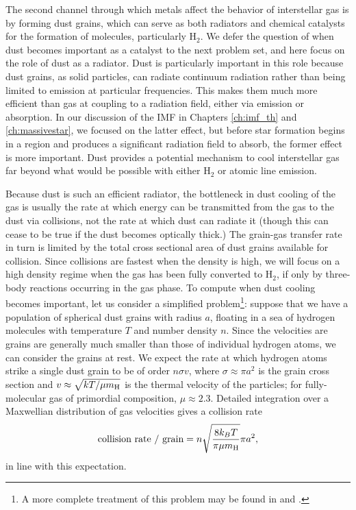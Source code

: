 The second channel through which metals affect the behavior of interstellar gas is by forming dust grains, which can serve as both radiators and chemical catalysts for the formation of molecules, particularly H$_2$. We defer the question of when dust becomes important as a catalyst to the next problem set, and here focus on the role of dust as a radiator. Dust is particularly important in this role because dust grains, as solid particles, can radiate continuum radiation rather than being limited to emission at particular frequencies. This makes them much more efficient than gas at coupling to a radiation field, either via emission or absorption. In our discussion of the IMF in Chapters \ref{ch:imf_th} and \ref{ch:massivestar}, we focused on the latter effect, but before star formation begins in a region and produces a significant radiation field to absorb, the former effect is more important. Dust provides a potential mechanism to cool interstellar gas far beyond what would be possible with either H$_2$ or atomic line emission.

Because dust is such an efficient radiator, the bottleneck in dust cooling of the gas is usually the rate at which energy can be transmitted from the gas to the dust via collisions, not the rate at which dust can radiate it (though this can cease to be true if the dust becomes optically thick.) The grain-gas transfer rate in turn is limited by the total cross sectional area of dust grains available for collision. Since collisions are fastest when the density is high, we will focus on a high density regime when the gas has been fully converted to H$_2$, if only by three-body reactions occurring in the gas phase. To compute when dust cooling becomes important, let us consider a simplified problem\footnote{A more complete treatment of this problem may be found in \citet{schneider06a} and \citet{schneider12a}.}: suppose that we have a population of spherical dust grains with radius $a$, floating in a sea of hydrogen molecules with temperature $T$ and number density $n$. Since the velocities are grains are generally much smaller than those of individual hydrogen atoms, we can consider the grains at rest. We expect the rate at which hydrogen atoms strike a single dust grain to be of order $n\sigma v$, where $\sigma \approx \pi a^2$ is the grain cross section and $v\approx \sqrt{kT/\mu m_{\rm H}}$ is the thermal velocity of the particles; for fully-molecular gas of primordial composition, $\mu \approx 2.3$. Detailed integration over a Maxwellian distribution of gas velocities \citep{draine11a} gives a collision rate
\begin{equation}
\mbox{collision rate / grain} = n \sqrt{\frac{8 k_B T}{\pi \mu m_{\rm H}}} \pi a^2,
\end{equation}
in line with this expectation.

